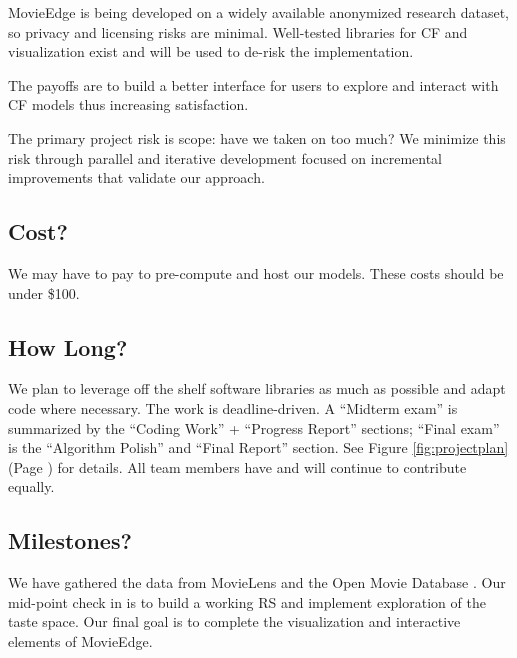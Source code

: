 MovieEdge is being developed on a widely available anonymized research dataset, so privacy and licensing risks are minimal. Well-tested libraries for CF and visualization exist and will be used to de-risk the implementation. 

The payoffs are to build a better interface for users to explore and interact with CF models thus increasing satisfaction. 

The primary project risk is scope: have we taken on too much?   We minimize this risk through parallel and iterative development focused on  incremental improvements that validate our approach.

\subsection{Cost?}
We may have to pay to pre-compute and host our models. These costs should be under \$100.

\subsection{How Long?}
We plan to leverage off the shelf software libraries as much as possible and adapt code where necessary. The work is deadline-driven.  A “Midterm exam” is summarized by the “Coding Work” + “Progress Report” sections; “Final exam” is the “Algorithm Polish” and “Final Report” section.  See Figure \ref{fig:projectplan}  (Page \pageref{fig:projectplan}) for details.  All team members have and will continue to contribute equally.

\subsection{Milestones?}
We have gathered the data from MovieLens \cite{harper2016movielens} and the Open Movie Database \cite{openMovieDB}. Our mid-point check in is to build a working RS and implement exploration of the taste space. Our final goal is to complete the visualization and interactive elements of MovieEdge.

